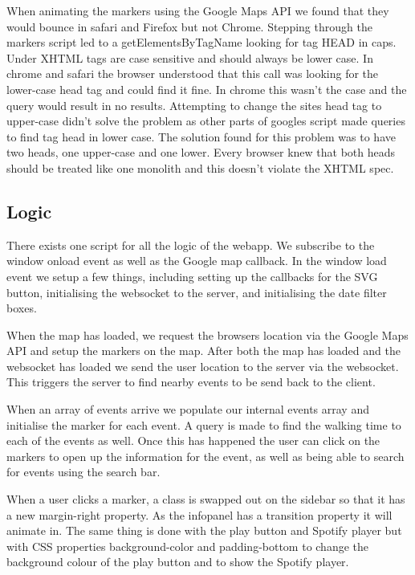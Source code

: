 \documentclass[10pt]{article}
\begin{document}
                When animating the markers using the Google Maps API we found that they would bounce in safari and Firefox but not Chrome. Stepping through the markers script led to a getElementsByTagName looking for tag HEAD in caps. Under XHTML tags are case sensitive and should always be lower case. In chrome and safari the browser understood that this call was looking for the lower-case head tag and could find it fine. In chrome this wasn't the case and the query would result in no results. Attempting to change the sites head tag to upper-case didn't solve the problem as other parts of googles script made queries to find tag head in lower case. The solution found for this problem was to have two heads, one upper-case and one lower. Every browser knew that both heads should be treated like one monolith and this doesn't violate the XHTML spec.


        \subsection{Logic}
            There exists one script for all the logic of the webapp. We subscribe to the window onload event as well as the Google map callback. In the window load event we setup a few things, including setting up the callbacks for the SVG button, initialising the websocket to the server, and initialising the date filter boxes.

            When the map has loaded, we request the browsers location via the Google Maps API and setup the markers on the map. After both the map has loaded and the websocket has loaded we send the user location to the server via the websocket. This triggers the server to find nearby events to be send back to the client.

            When an array of events arrive we populate our internal events array and initialise the marker for each event. A query is made to find the walking time to each of the events as well. Once this has happened the user can click on the markers to open up the information for the event, as well as being able to search for events using the search bar.

            When a user clicks a marker, a class is swapped out on the sidebar so that it has a new margin-right property. As the infopanel has a transition property it will animate in. The same thing is done with the play button and Spotify player but with CSS properties background-color and padding-bottom to change the background colour of the play button and to show the Spotify player.
\end{document}
